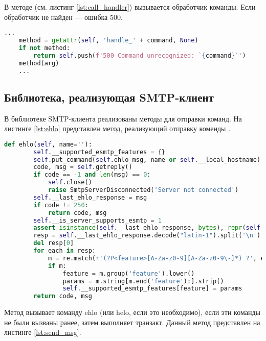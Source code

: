 В методе  (см. листинг \ref{lst:call_handler}) вызывается обработчик команды. Если обработчик не найден --- ошибка 500.

\begin{lstlisting}[gobble=8, language=Python, caption={Вызов обработчика команды \code{EHLO}\label{lst:call_handler}}]
	...
	method = getattr(self, 'handle_' + command, None)
	if not method:
		return self.push(f'500 Command unrecognized: `{command}`')
	method(arg)
	...
\end{lstlisting}

\subsection{Библиотека, реализующая SMTP-клиент}

В библиотеке SMTP-клиента реализованы методы для отправки команд. На листинге \ref{lst:ehlo} представлен метод, реализующий отправку коменды .

\begin{lstlisting}[gobble=8, language=Python, caption={Отправка команды \code{EHLO}\label{lst:ehlo}}]
	def ehlo(self, name=''):
		self.__supported_esmtp_features = {}
		self.put_command(self.ehlo_msg, name or self.__local_hostname)
		code, msg = self.getreply()
		if code == -1 and len(msg) == 0:
			self.close()
			raise SmtpServerDisconnected('Server not connected')
		self.__last_ehlo_response = msg
		if code != 250:
			return code, msg
		self.__is_server_supports_esmtp = 1
		assert isinstance(self.__last_ehlo_response, bytes), repr(self.__last_ehlo_response)
		resp = self.__last_ehlo_response.decode("latin-1").split('\n')
		del resp[0]
		for each in resp:
			m = re.match(r'(?P<feature>[A-Za-z0-9][A-Za-z0-9\-]*) ?', each)
			if m:
				feature = m.group('feature').lower()
				params = m.string[m.end('feature'):].strip()
				self.__supported_esmtp_features[feature] = params
		return code, msg
\end{lstlisting}

Метод  вызывает команду ehlo (или helo, если это необходимо), если эти команды не были вызваны ранее, затем выполняет транзакт. Данный метод представлен на листинге \ref{lst:send_msg}.

